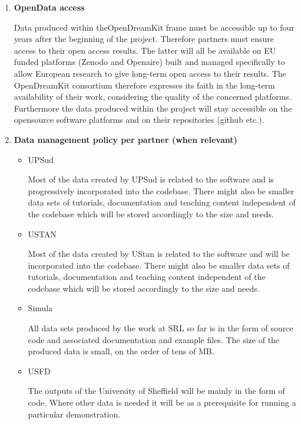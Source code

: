 \documentclass{deliverablereport}
\begin{document}
\begin{enumerate}
\item\textbf{OpenData access}

Data produced within theOpenDreamKit frame must be accessible up to four years after the beginning of the project. Therefore partners must ensure access to their open access results.
The latter will all be available on EU funded platforms (Zenodo and Openaire) built and managed specifically to allow European research to give long-term open access to their results. The OpenDreamKit consortium therefore expresses its faith in the long-term availability of their work, considering the quality of the concerned platforms. Furthermore the data produced within the project will stay accessible on the opensource software platforms and on their repositories (github etc.).


\item\textbf{Data management policy per partner (when relevant)}
\begin{itemize}



\item{UPSud}

Most of the data created by UPSud is related to the software \Sage and
is progressively incorporated into the \Sage codebase. There might also be smaller data sets of tutorials, documentation and teaching content independent of the \Sage codebase which will be stored accordingly to the size and needs.



\item{USTAN}

Most of the data created by UStan is related to the software \GAP and will be incorporated into the \GAP codebase. There might also be smaller data sets of tutorials, documentation and teaching content independent of the \GAP codebase which will be stored accordingly to the size and needs.



\item{Simula}

All data sets produced by the work at SRL so far is in the form of source code and associated documentation and example files. The size of the produced data is small, on the order of tens of MB.



\item{USFD}



The outputs of the University of Sheffield will be mainly in the form of code. Where other data is needed it will be as a prerequisite for running a particular demonstration. 
\end{itemize}
\end{enumerate}
\end{document}
